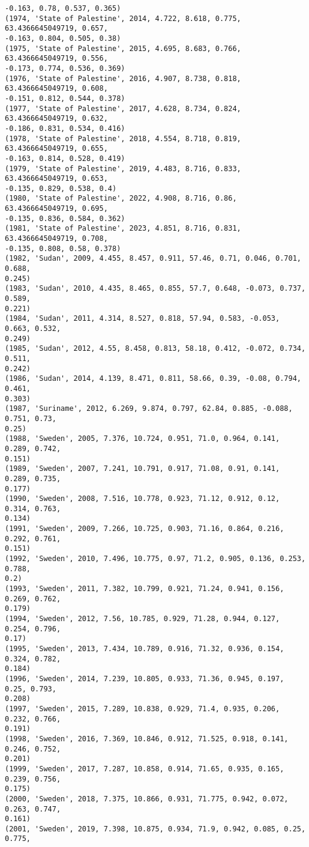 \documentclass[11pt]{article}
\begin{document}
\begin{Verbatim}[commandchars=\\\{\}]
-0.163, 0.78, 0.537, 0.365)
(1974, 'State of Palestine', 2014, 4.722, 8.618, 0.775, 63.4366645049719, 0.657,
-0.163, 0.804, 0.505, 0.38)
(1975, 'State of Palestine', 2015, 4.695, 8.683, 0.766, 63.4366645049719, 0.556,
-0.173, 0.774, 0.536, 0.369)
(1976, 'State of Palestine', 2016, 4.907, 8.738, 0.818, 63.4366645049719, 0.608,
-0.151, 0.812, 0.544, 0.378)
(1977, 'State of Palestine', 2017, 4.628, 8.734, 0.824, 63.4366645049719, 0.632,
-0.186, 0.831, 0.534, 0.416)
(1978, 'State of Palestine', 2018, 4.554, 8.718, 0.819, 63.4366645049719, 0.655,
-0.163, 0.814, 0.528, 0.419)
(1979, 'State of Palestine', 2019, 4.483, 8.716, 0.833, 63.4366645049719, 0.653,
-0.135, 0.829, 0.538, 0.4)
(1980, 'State of Palestine', 2022, 4.908, 8.716, 0.86, 63.4366645049719, 0.695,
-0.135, 0.836, 0.584, 0.362)
(1981, 'State of Palestine', 2023, 4.851, 8.716, 0.831, 63.4366645049719, 0.708,
-0.135, 0.808, 0.58, 0.378)
(1982, 'Sudan', 2009, 4.455, 8.457, 0.911, 57.46, 0.71, 0.046, 0.701, 0.688,
0.245)
(1983, 'Sudan', 2010, 4.435, 8.465, 0.855, 57.7, 0.648, -0.073, 0.737, 0.589,
0.221)
(1984, 'Sudan', 2011, 4.314, 8.527, 0.818, 57.94, 0.583, -0.053, 0.663, 0.532,
0.249)
(1985, 'Sudan', 2012, 4.55, 8.458, 0.813, 58.18, 0.412, -0.072, 0.734, 0.511,
0.242)
(1986, 'Sudan', 2014, 4.139, 8.471, 0.811, 58.66, 0.39, -0.08, 0.794, 0.461,
0.303)
(1987, 'Suriname', 2012, 6.269, 9.874, 0.797, 62.84, 0.885, -0.088, 0.751, 0.73,
0.25)
(1988, 'Sweden', 2005, 7.376, 10.724, 0.951, 71.0, 0.964, 0.141, 0.289, 0.742,
0.151)
(1989, 'Sweden', 2007, 7.241, 10.791, 0.917, 71.08, 0.91, 0.141, 0.289, 0.735,
0.177)
(1990, 'Sweden', 2008, 7.516, 10.778, 0.923, 71.12, 0.912, 0.12, 0.314, 0.763,
0.134)
(1991, 'Sweden', 2009, 7.266, 10.725, 0.903, 71.16, 0.864, 0.216, 0.292, 0.761,
0.151)
(1992, 'Sweden', 2010, 7.496, 10.775, 0.97, 71.2, 0.905, 0.136, 0.253, 0.788,
0.2)
(1993, 'Sweden', 2011, 7.382, 10.799, 0.921, 71.24, 0.941, 0.156, 0.269, 0.762,
0.179)
(1994, 'Sweden', 2012, 7.56, 10.785, 0.929, 71.28, 0.944, 0.127, 0.254, 0.796,
0.17)
(1995, 'Sweden', 2013, 7.434, 10.789, 0.916, 71.32, 0.936, 0.154, 0.324, 0.782,
0.184)
(1996, 'Sweden', 2014, 7.239, 10.805, 0.933, 71.36, 0.945, 0.197, 0.25, 0.793,
0.208)
(1997, 'Sweden', 2015, 7.289, 10.838, 0.929, 71.4, 0.935, 0.206, 0.232, 0.766,
0.191)
(1998, 'Sweden', 2016, 7.369, 10.846, 0.912, 71.525, 0.918, 0.141, 0.246, 0.752,
0.201)
(1999, 'Sweden', 2017, 7.287, 10.858, 0.914, 71.65, 0.935, 0.165, 0.239, 0.756,
0.175)
(2000, 'Sweden', 2018, 7.375, 10.866, 0.931, 71.775, 0.942, 0.072, 0.263, 0.747,
0.161)
(2001, 'Sweden', 2019, 7.398, 10.875, 0.934, 71.9, 0.942, 0.085, 0.25, 0.775,

\end{Verbatim}
\end{document}
